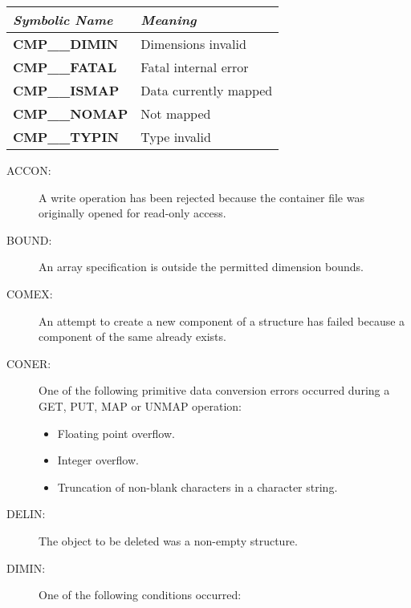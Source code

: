\documentclass[twoside,11pt]{starlink}
\providecommand{\st}[1]{{\emph{#1}}}
\begin{document}
\begin{center}
\begin{tabular}{|l|l|} \hline
\st{Symbolic Name} & \st{Meaning}\\ \hline \hline
\textbf{CMP\_\_DIMIN} & Dimensions invalid\\
\textbf{CMP\_\_FATAL} & Fatal internal error\\
\textbf{CMP\_\_ISMAP} & Data currently mapped\\
\textbf{CMP\_\_NOMAP} & Not mapped\\
\textbf{CMP\_\_TYPIN} & Type invalid\\[2ex]
\hline
\end{tabular}
\end{center}
\normalsize

\begin{description}

\item [ACCON:]
A write operation has been rejected because the container file was originally
opened for read-only access.

\item [BOUND:]
An array specification is outside the permitted dimension bounds.

\item [COMEX:]
An attempt to create a new component of a structure has failed because a
component of the same  already exists.

\item [CONER:]
One of the following primitive data conversion errors occurred during a
GET, PUT, MAP or UNMAP operation:

\begin{itemize}

\item Floating point overflow.

\item Integer overflow.

\item Truncation of non-blank characters in a character string.

\end{itemize}

\item [DELIN:]
The object to be deleted was a non-empty structure.

\item [DIMIN:]
One of the following conditions occurred:

\begin{itemize}


\end{itemize}
\end{description}
\end{document}
